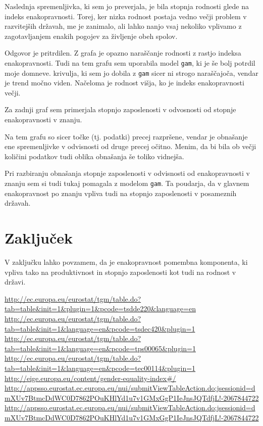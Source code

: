 \documentclass[11pt,a4paper]{article}
\begin{document}
Naslednja spremenljivka, ki sem jo preverjala, je bila stopnja rodnosti glede na indeks enakopravnosti. Torej, ker nizka rodnost postaja vedno večji problem v razvitejših državah, me je zanimalo, ali lahko nanjo vsaj nekoliko vplivamo z zagotavljanjem enakih pogojev za življenje obeh spolov.



Odgovor je pritrdilen. Z grafa je opazno naraščanje rodnosti z rastjo indeksa enakopravnosti. Tudi na tem grafu sem uporabila model \verb-gam-, ki je še bolj potrdil moje domneve. krivulja, ki sem jo dobila z \verb-gam- sicer ni strogo naraščajoča, vendar je trend močno viden. Načeloma je rodnost višja, ko je indeks enakopravnosti večji.

Za zadnji graf sem primerjala stopnjo zaposlenosti v odvosnosti od stopnje enakopravnosti v znanju. 



Na tem grafu so sicer točke (tj. podatki) precej razpršene, vendar je obnašanje ene spremenljivke v odvisnosti od druge precej očitno. Menim, da bi bila ob večji količini podatkov tudi oblika obnašanja še toliko vidnejša. 

Pri razbiranju obnašanja stopnje zaposlenosti v odvisnosti od enakopravnosti v znanju sem si tudi tukaj pomagala z modelom \verb-gam-. Ta poudarja, da v glavnem enakopravnost po znanju vpliva tudi na stopnjo zaposlenosti v posameznih državah.

\section{Zaključek}
V zaključku lahko povzamem, da je enakopravnost pomembna komponenta, ki vpliva tako na produktivnost in stopnjo zaposlenosti kot tudi na rodnost v državi.
\begin{thebibliography}{9}
  \url{http://ec.europa.eu/eurostat/tgm/table.do?tab=table&init=1&plugin=1&pcode=tsdde220&language=en}\\
  \url{http://ec.europa.eu/eurostat/tgm/table.do?tab=table&init=1&language=en&pcode=tsdec420&plugin=1}\\
  \url{http://ec.europa.eu/eurostat/tgm/table.do?tab=table&init=1&language=en&pcode=tps00065&plugin=1}\\
  \url{http://ec.europa.eu/eurostat/tgm/table.do?tab=table&init=1&language=en&pcode=tec00114&plugin=1}\\
  \url{http://eige.europa.eu/content/gender-equality-index#/}\\
  \url{http://appsso.eurostat.ec.europa.eu/nui/submitViewTableAction.do;jsessionid=dmXUv7BtmcDdWC0D7862POuKHlYd1u7v1GMxGgP1IeJnsJQTdfjL!-2067844722}\\
  \url{http://appsso.eurostat.ec.europa.eu/nui/submitViewTableAction.do;jsessionid=dmXUv7BtmcDdWC0D7862POuKHlYd1u7v1GMxGgP1IeJnsJQTdfjL!-2067844722}\\
\end{thebibliography}



\end{document}

